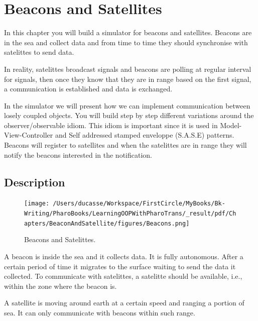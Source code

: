 \documentclass[10pt,twoside,english]{_support/latex/sbabook/sbabook}
\begin{document}
\frontmatter
\pagestyle{plain}

\tableofcontents*
\clearpage\listoffigures

\mainmatter

\chapter{Beacons and Satellites }\label{ch:beacon}
In this chapter you will build a simulator for beacons and satellites. Beacons are in the sea and collect data and from time to time they should synchronise with satelittes to send data. 

In reality, satelittes broadcast signals and beacons are polling at regular interval for signals, then once they know that they are in range based on the first signal, a communication is established and data is exchanged.

In the simulator we will present how we can implement communication between losely coupled objects. You will build step by step different variations around the observer/observable idiom. This idiom is important since it is used in Model-View-Controller and Self addressed stamped enveloppe (S.A.S.E) patterns. Beacons will register to satellites and when the satelittes are in range they will notify the beacons interested in the notification. 
\section{Description}

\begin{figure}

\begin{center}
\texttt{[image: /Users/ducasse/Workspace/FirstCircle/MyBooks/Bk-Writing/PharoBooks/LearningOOPWithPharoTrans/\_result/pdf/Chapters/BeaconAndSatellite/figures/Beacons.png]}\caption{Beacons and Satelittes.\label{fig:Beacon}}\end{center}
\end{figure}


A beacon is inside the sea and it collects data. It is fully autonomous. After a certain period of time it migrates to the surface waiting to send the data it collected.
To communicate with satelittes, a satelitte should be available, i.e., within the zone where the beacon is.

A satellite is moving around earth at a certain speed and ranging a portion of sea. 
It can only communicate with beacons within such range.
\end{document}
